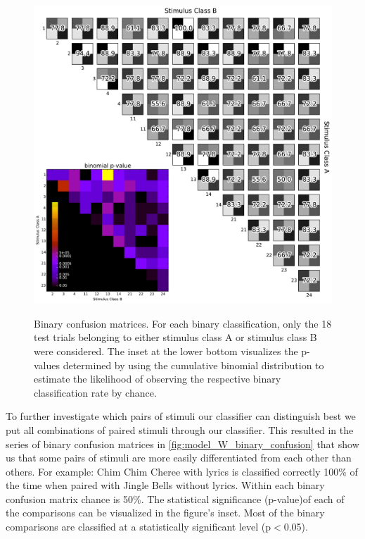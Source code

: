 \begin{figure}[h] 
  \begin{center}
    \includegraphics[width=.83\textwidth,keepaspectratio=true]{Figures/model_W_binary_confusion}
   \\\vspace{-0.8em}
    \caption{Binary confusion matrices.
    For each binary classification, only the 18 test trials belonging to either stimulus class A or stimulus class B were considered.
    The inset at the lower bottom visualizes the p-values determined by using the cumulative binomial distribution to estimate the likelihood of observing the respective binary classification rate by chance.}
    \label{fig:model_W_binary_confusion}
  \end{center}
  \vspace{-1em}
\end{figure}

To further investigate which pairs of stimuli our classifier can distinguish best we put all combinations of paired stimuli through our classifier.
This resulted in the series of binary confusion matrices in \autoref{fig:model_W_binary_confusion} that show us that some pairs of stimuli are more easily differentiated from each other than others. 
For example: Chim Chim Cheree with lyrics is classified correctly 100\% of the time when paired with Jingle Bells without lyrics. 
Within each binary confusion matrix chance is 50\%.
The statistical significance (p-value)of each of the comparisons can be visualized in the figure's inset. 
Most of the binary comparisons are classified at a statistically significant level (p$<$0.05). 

